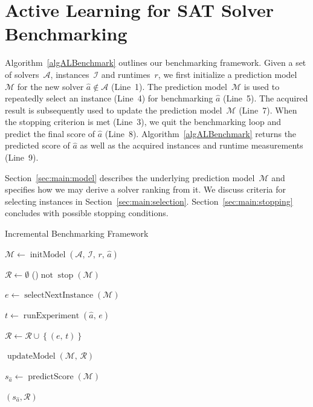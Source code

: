 \documentclass[sn-basic, Numbered]{sn-jnl} %
\begin{document}
\section{Active Learning for SAT Solver Benchmarking}
\label{sec:main}

Algorithm~\ref{algALBenchmark} outlines our benchmarking framework. 
Given a set of solvers~$\mathcal{A}$, instances~$\mathcal{I}$ and runtimes~$r$, we first initialize a prediction model~$\mathcal{M}$ for the new solver $\hat a \not\in \mathcal{A}$ (Line~1).
The prediction model~$\mathcal{M}$ is used to repeatedly select an instance (Line~4) for benchmarking $\hat a$ (Line~5). 
The acquired result is subsequently used to update the prediction model~$\mathcal{M}$ (Line~7). 
When the stopping criterion is met (Line~3), we quit the benchmarking loop and predict the final score of $\hat a$ (Line~8). 
Algorithm~\ref{algALBenchmark} returns the predicted score of $\hat a$ as well as the acquired instances and runtime measurements (Line~9). 

Section~\ref{sec:main:model} describes the underlying prediction model~$\mathcal{M}$ and specifies how we may derive a solver ranking from it.
We discuss criteria for selecting instances in Section~\ref{sec:main:selection}.
Section~\ref{sec:main:stopping} concludes with possible stopping conditions.

\begin{algorithm}[t]
  \caption{Incremental Benchmarking Framework}
  \label{algALBenchmark}


  \BlankLine

  $\mathcal{M} \leftarrow \operatorname{initModel}\left(\mathcal{A},\, \mathcal{I},\, r,\, \hat{a}\right)$ 
  
  \BlankLine
  $\mathcal{R} \leftarrow \emptyset$ \;
  \While(){$\operatorname{not} \operatorname{stop}\left(\mathcal{M}\right)$}{
    $e \leftarrow \operatorname{selectNextInstance}\left(\mathcal{M}\right)$ 

    $t \leftarrow \operatorname{runExperiment}\left(\hat{a},\,  e\right)$  

    $\mathcal{R} \leftarrow \mathcal{R} \cup \left\lbrace (e,\, t) \right\rbrace$

    \BlankLine
    $\operatorname{updateModel}\left(\mathcal{M},\, \mathcal{R}\right)$ 
  }
  $s_{\hat a} \leftarrow \operatorname{predictScore}(\mathcal{M})$ 
  
  \BlankLine
  \Return $(s_{\hat a}, \mathcal{R})$
\end{algorithm}
\end{document}
